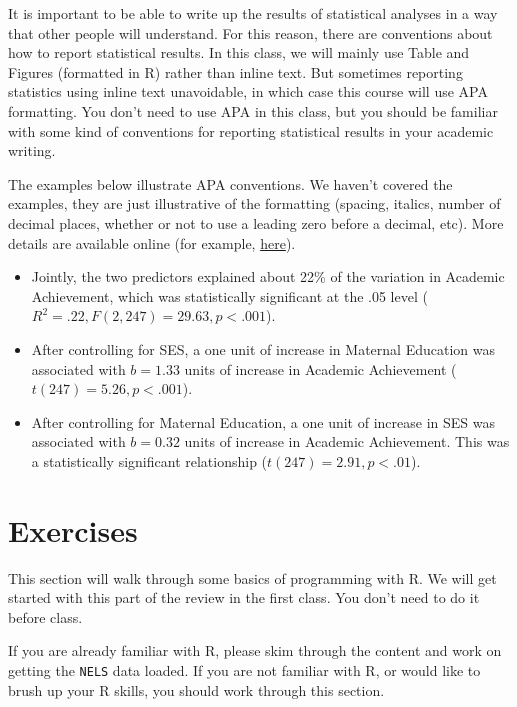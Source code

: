 \documentclass[
  letterpaper,
  DIV=11,
  numbers=noendperiod]{scrreprt}
\begin{document}
It is important to be able to write up the results of statistical
analyses in a way that other people will understand. For this reason,
there are conventions about how to report statistical results. In this
class, we will mainly use Table and Figures (formatted in R) rather than
inline text. But sometimes reporting statistics using inline text
unavoidable, in which case this course will use APA formatting. You
don't need to use APA in this class, but you should be familiar with
some kind of conventions for reporting statistical results in your
academic writing.

The examples below illustrate APA conventions. We haven't covered the
examples, they are just illustrative of the formatting (spacing,
italics, number of decimal places, whether or not to use a leading zero
before a decimal, etc). More details are available online (for example,
\href{https://psych.uw.edu/storage/writing_center/stats.pdf}{here}).

\begin{itemize}
\item
  Jointly, the two predictors explained about 22\% of the variation in
  Academic Achievement, which was statistically significant at the .05
  level (\(R^2 = .22, F(2, 247) = 29.63, p < .001\)).
\item
  After controlling for SES, a one unit of increase in Maternal
  Education was associated with \(b = 1.33\) units of increase in
  Academic Achievement (\(t(247) = 5.26, p < .001\)).
\item
  After controlling for Maternal Education, a one unit of increase in
  SES was associated with \(b = 0.32\) units of increase in Academic
  Achievement. This was a statistically significant relationship
  (\(t(247) = 2.91, p < .01\)).
\end{itemize}

\hypertarget{sec-exercizes-1}{%
\section{Exercises}\label{sec-exercizes-1}}

This section will walk through some basics of programming with R. We
will get started with this part of the review in the first class. You
don't need to do it before class.

If you are already familiar with R, please skim through the content and
work on getting the \texttt{NELS} data loaded. If you are not familiar
with R, or would like to brush up your R skills, you should work through
this section.
\end{document}
